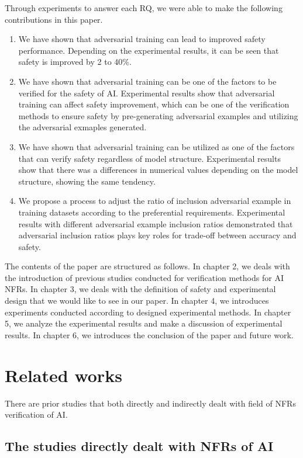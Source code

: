\documentclass[journal,article,submit,moreauthors,pdftex]{Definitions/mdpi}
\begin{document}
Through experiments to answer each RQ, we were able to make the following contributions in this paper.

\begin{enumerate}
    \item	We have shown that adversarial training can lead to improved safety performance. Depending on the experimental results, it can be seen that safety is improved by 2 to 40\%.
    \item	We have shown that adversarial training can be one of the factors to be verified for the safety of AI. Experimental results show that adversarial training can affect safety improvement, which can be one of the verification methods to ensure safety by pre-generating adversarial examples and utilizing the adversarial exmaples generated.
    \item   We have shown that adversarial training can be utilized as one of the factors that can verify safety regardless of model structure. Experimental results show that there was a differences in numerical values depending on the model structure, showing the same tendency.
    \item	We propose a process to adjust the ratio of inclusion adversarial example in training datasets according to the preferential requirements. Experimental results with different adversarial example inclusion ratios demonstrated that adversarial inclusion ratios plays key roles for trade-off between accuracy and safety.
\end{enumerate} 

The contents of the paper are structured as follows. In chapter 2, we deals with the introduction of previous studies conducted for verification methods for AI NFRs.
In chapter 3, we deals with the definition of safety and experimental design that we would like to see in our paper.
In chapter 4, we introduces experiments conducted according to designed experimental methods.
In chapter 5, we analyze the experimental results and make a discussion of experimental results.
In chapter 6, we introduces the conclusion of the paper and future work.

\section{Related works}

There are prior studies that both directly and indirectly dealt with field of NFRs verification of AI.

\subsection{The studies directly dealt with NFRs of AI}
\end{document}

